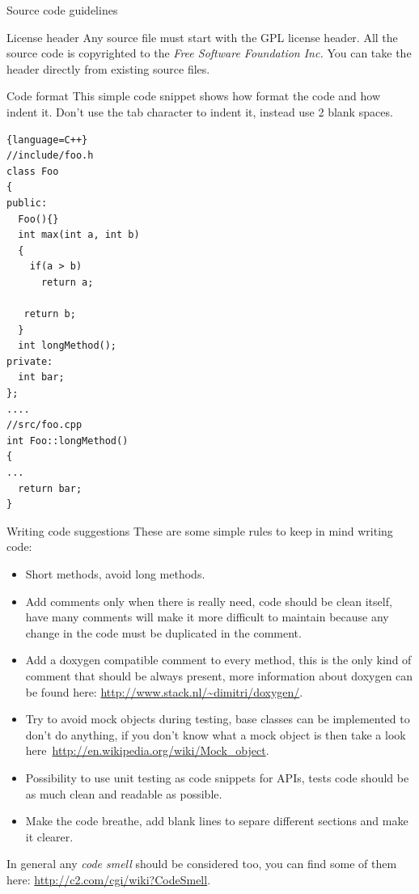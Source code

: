 \documentclass[12pt]{article}
\begin{document}
\begin{section}{Source code guidelines}

\begin{subsection}{License header}
Any source file must start with the GPL license header.  All the
source code is copyrighted to the \textit{Free Software Foundation
  Inc.}
You can take the header directly from existing source files.
\end{subsection}

\begin{subsection}{Code format}
This simple code snippet shows how format the code and how indent it.
Don't use the tab character to indent it, instead use 2 blank spaces. 

\begin{lstlisting}{language=C++}
//include/foo.h
class Foo
{
public:
  Foo(){}
  int max(int a, int b)
  {
    if(a > b)
      return a;

   return b;
  }
  int longMethod();
private:
  int bar;
};
....
//src/foo.cpp
int Foo::longMethod()
{
...
  return bar;
}
\end{lstlisting}
\end{subsection}

\begin{subsection}{Writing code suggestions}
These are some simple rules to keep in mind writing code:
\begin{itemize}
\item Short methods, avoid long methods.
\item Add comments only when there is really need, code should be
  clean itself, have many comments will make it more difficult to
  maintain because any change in the code must be duplicated in the
  comment.
\item Add a doxygen compatible comment to every method, this is the
  only kind of comment that should be always present, more information
  about doxygen can be found here:
  \url{http://www.stack.nl/~dimitri/doxygen/}.
\item Try to avoid mock objects during testing, base classes can be
  implemented to don't do anything, if you don't know what a mock
  object is then take a look
  here~\url{http://en.wikipedia.org/wiki/Mock_object}.
\item Possibility to use unit testing as code snippets for APIs, tests
  code should be as much clean and readable as possible.
\item Make the code breathe, add blank lines to separe different
  sections and make it clearer.
\end{itemize}
\end{subsection}
In general any \textit{code smell} should be considered too, you can
find some of them here: \url{http://c2.com/cgi/wiki?CodeSmell}.
\end{section}
\clearpage
\end{document}
